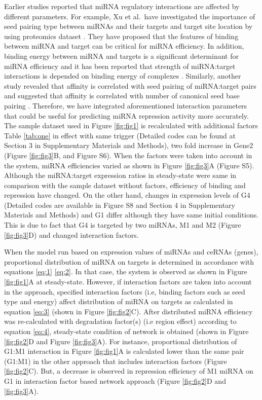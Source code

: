 \documentclass[a4,center,fleqn]{NAR}
\begin{document}
Earlier studies reported that miRNA regulatory interactions are affected
by different parameters. For example, Xu et al.~have investigated the
importance of seed pairing type between miRNAs and their targets and
target site location by using proteomics dataset
\citep{xu_characterization_2014}. They have proposed that the features
of binding between miRNA and target can be critical for miRNA
efficiency. In addition, binding energy between miRNA and targets is a
significant determinant for miRNA efficiency and it has been reported
that strength of miRNA:target interactions is depended on binding energy
of complexes \citep{breda_quantifying_2015}. Similarly, another study
revealed that affinity is correlated with seed pairing of miRNA:target
pairs and suggested that affinity is correlated with number of canonical
seed base pairing \citep{bosson_endogenous_2014}. Therefore, we have
integrated aforementioned interaction parameters that could be useful
for predicting miRNA repression activity more accurately. The sample
dataset used in Figure \ref{fig:fig1} is recalculated with additional
factors Table \ref{tab:one} in effect with same trigger (Detailed codes
can be found at Section 3 in Supplementary Materials and Methods), two
fold increase in Gene2 (Figure \ref{fig:fig3}B, and Figure S6). When the
factors were taken into account in the system, miRNA efficiencies varied
as shown in Figure \ref{fig:fig3}A (Figure S5). Although the
miRNA:target expression ratios in steady-state were same in comparison
with the sample dataset without factors, efficiency of binding and
repression have changed. On the other hand, changes in expression levels
of G4 (Detailed codes are available in Figure S8 and Section 4 in
Supplementary Materials and Methods) and G1 differ although they have
same initial conditions. This is due to fact that G4 is targeted by two
miRNAs, M1 and M2 (Figure \ref{fig:fig3}D) and changed interaction
factors.

When the model run based on expression values of miRNAs and ceRNAs
(genes), proportional distribution of miRNA on targets is determined in
accordance with equations \eqref{eq:1} \eqref{eq:2}. In that case, the
system is observed as shown in Figure \ref{fig:fig1}A at steady-state.
However, if interaction factors are taken into account in the approach,
specified interaction factors (i.e, binding factors such as seed type
and energy) affect distribution of miRNA on targets as calculated in
equation \eqref{eq:3} (shown in Figure \ref{fig:fig2}C). After
distributed miRNA efficiency was re-calculated with degradation
factor(s) (i.e region effect) according to equation \eqref{eq:4},
steady-state condition of network is obtained (shown in Figure
\ref{fig:fig2}D and Figure \ref{fig:fig3}A). For instance, proportional
distribution of G1:M1 interaction in Figure \ref{fig:fig1}A is
calculated lower than the same pair (G1:M1) in the other approach that
includes interaction factors (Figure \ref{fig:fig2}C). But, a decrease
is observed in repression efficiency of M1 miRNA on G1 in interaction
factor based network approach (Figure \ref{fig:fig2}D and
\ref{fig:fig3}A).
\end{document}

